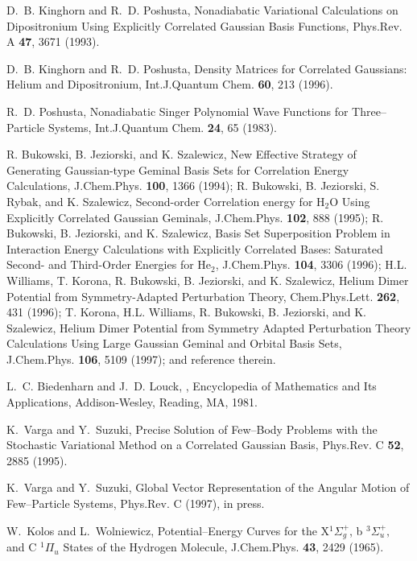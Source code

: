 \begin{thebibliography}{999}
D.~B. Kinghorn and R.~D. Poshusta,
Nonadiabatic Variational Calculations on Dipositronium
Using Explicitly Correlated Gaussian Basis Functions,
\newblock Phys.Rev. A {\bf 47}, 3671 (1993).

D.~B. Kinghorn and R.~D. Poshusta,
Density Matrices for Correlated Gaussians: Helium and
Dipositronium,
\newblock Int.J.Quantum Chem. {\bf 60}, 213 (1996).

R.~D. Poshusta,
Nonadiabatic Singer Polynomial Wave Functions for 
Three--Particle Systems,
\newblock Int.J.Quantum Chem. 
{\bf 24}, 65 (1983).

R. Bukowski, B. Jeziorski, and K. Szalewicz,
New Effective Strategy of Generating Gaussian-type Geminal
Basis Sets for Correlation Energy Calculations,
J.Chem.Phys. {\bf 100}, 1366 (1994);
R. Bukowski, B. Jeziorski, S. Rybak, and K. Szalewicz,
Second-order Correlation energy for H$_2$O Using
Explicitly Correlated Gaussian Geminals,
J.Chem.Phys. {\bf 102}, 888 (1995);
R. Bukowski, B. Jeziorski, and K. Szalewicz,
Basis Set Superposition Problem in Interaction Energy
Calculations with Explicitly Correlated Bases:
Saturated Second- and Third-Order Energies for He$_2$,
J.Chem.Phys. {\bf 104}, 3306 (1996);
H.L. Williams, T. Korona, R. Bukowski, B. Jeziorski, and K. Szalewicz,
Helium Dimer Potential from Symmetry-Adapted
Perturbation Theory,
Chem.Phys.Lett. {\bf 262}, 431 (1996);
T. Korona, H.L. Williams, R. Bukowski,
B. Jeziorski, and K. Szalewicz,
Helium Dimer Potential from Symmetry Adapted Perturbation Theory
Calculations Using Large Gaussian Geminal and Orbital Basis Sets,
J.Chem.Phys. {\bf 106}, 5109 (1997);
and reference therein.


L.~C. Biedenharn and J.~D. Louck,
,
\newblock Encyclopedia of Mathematics and Its Applications, Addison-{W}esley,
Reading, {MA}, 1981.

K.~Varga and Y.~Suzuki,
Precise Solution of Few--Body Problems with the
Stochastic Variational Method on a Correlated Gaussian Basis,
\newblock Phys.Rev. C {\bf 52}, 2885 (1995).


K.~Varga and Y.~Suzuki,
Global Vector Representation of the Angular Motion of
Few--Particle Systems,
\newblock Phys.Rev. C  (1997),
\newblock in press.

W.~Kolos and L.~Wolniewicz,
Potential--Energy Curves for the X$^{1} \Sigma _g^+$, 
b $^{3}\Sigma_u ^+,$
and C $^{1} \Pi_u$ States of the Hydrogen Molecule,
\newblock J.Chem.Phys. {\bf 43}, 2429 (1965).


\end{thebibliography}
